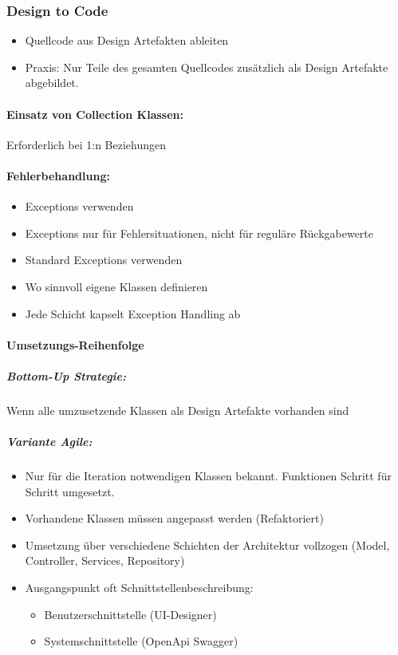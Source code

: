 \documentclass[../ZF_SWEN1.tex]{subfiles}
\begin{document}
\subsubsection{Design to Code}
\begin{itemize}
	\item Quellcode aus Design Artefakten ableiten
	\item Praxis: Nur Teile des gesamten Quellcodes zusätzlich als Design Artefakte abgebildet.
\end{itemize}

\paragraph{Einsatz von Collection Klassen:} Erforderlich bei 1:n Beziehungen

\paragraph{Fehlerbehandlung:\\}
\begin{itemize}
	\item Exceptions verwenden
	\item Exceptions nur für Fehlersituationen, nicht für reguläre Rückgabewerte
	\item Standard Exceptions verwenden
	\item Wo sinnvoll eigene Klassen definieren
	\item Jede Schicht kapselt Exception Handling ab
\end{itemize}


\paragraph{Umsetzungs-Reihenfolge}
\subparagraph{Bottom-Up Strategie:}
Wenn alle umzusetzende Klassen als Design Artefakte vorhanden sind

\subparagraph{Variante Agile:}
\begin{itemize}
	\item Nur für die Iteration notwendigen Klassen bekannt. Funktionen Schritt für Schritt umgesetzt.
	\item Vorhandene Klassen müssen angepasst werden (Refaktoriert)
	\item Umsetzung über verschiedene Schichten der Architektur vollzogen (Model, Controller, Services, Repository)
	\item Ausgangspunkt oft Schnittstellenbeschreibung:
	\begin{itemize}
		\item Benutzerschnittstelle (UI-Designer)
		\item Systemschnittstelle (OpenApi Swagger)
	\end{itemize}
\end{itemize}
\end{document}
